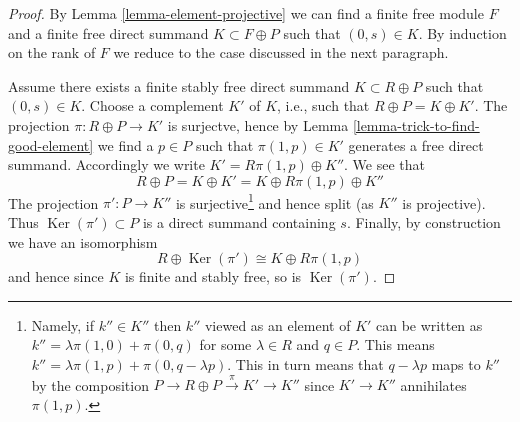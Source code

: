 \documentclass[10pt,a4paper]{amsart}
\theoremstyle{plain}
\theoremstyle{definition}
\theoremstyle{remark}
\numberwithin{equation}{subsection}
\def\Ker{\mathop{\mathrm{Ker}}}
\begin{document}
\begin{proof}
By Lemma \ref{lemma-element-projective} we can find a finite free
module $F$ and a finite free direct summand $K \subset F \oplus P$ such
that $(0, s) \in K$. By induction on the rank of $F$ we reduce
to the case discussed in the next paragraph.

\medskip\noindent
Assume there exists a finite stably free direct summand $K \subset R \oplus P$
such that $(0, s) \in K$. Choose a complement $K'$ of $K$, i.e.,
such that $R \oplus P = K \oplus K'$. The projection
$\pi : R \oplus P \to K'$ is surjectve, hence by
Lemma \ref{lemma-trick-to-find-good-element}
we find a $p \in P$ such that $\pi(1, p) \in K'$ generates
a free direct summand. Accordingly we write
$K' = R\pi(1, p) \oplus K''$. We see that
$$
R \oplus P = K \oplus K' = K \oplus R\pi(1, p) \oplus K''
$$
The projection $\pi' : P \to K''$ is surjective\footnote{Namely,
if $k'' \in K''$ then $k''$ viewed as an element of $K'$
can be written as $k'' = \lambda \pi(1, 0) + \pi(0, q)$
for some $\lambda \in R$ and $q \in P$.
This means $k'' = \lambda \pi(1, p) + \pi(0, q - \lambda p)$.
This in turn means that $q - \lambda p$ maps to $k''$ by
the composition $P \to R \oplus P \xrightarrow{\pi} K' \to K''$
since $K' \to K''$ annihilates $\pi(1, p)$.}
and hence split
(as $K''$ is projective). Thus $\Ker(\pi') \subset P$ is a
direct summand containing $s$. Finally, by construction we
have an isomorphism
$$
R \oplus \Ker(\pi') \cong K \oplus R\pi(1, p)
$$
and hence since $K$ is finite and stably free, so is $\Ker(\pi')$.
\end{proof}
\end{document}
